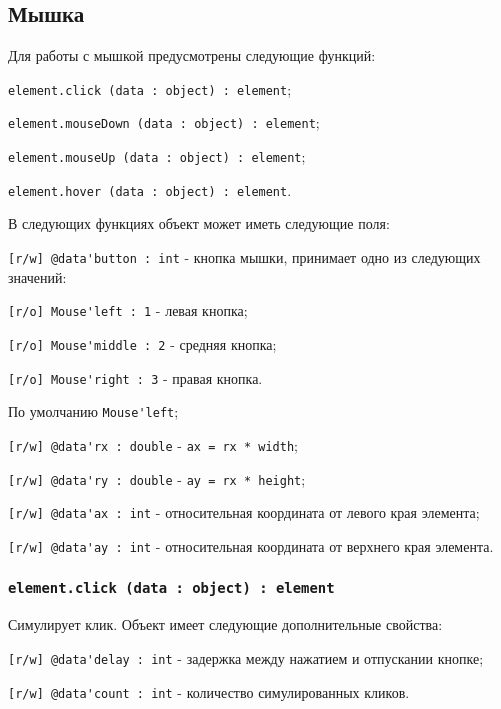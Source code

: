 \subsection{Мышка}
\label{mouse}

Для работы с мышкой предусмотрены следующие функций:
\begin{icItems}
	\item \lstinline|element.click (data : object) : element|;
	\item \lstinline|element.mouseDown (data : object) : element|;
	\item \lstinline|element.mouseUp (data : object) : element|;
	\item \lstinline|element.hover (data : object) : element|.
\end{icItems}

В следующих функциях объект  может иметь следующие поля:
\begin{icItems}
	\item \lstinline|[r/w] @data'button : int| - кнопка мышки, принимает одно из следующих значений:
	\begin{icItems}
		\item \lstinline|[r/o] Mouse'left : 1| - левая кнопка;
		\item \lstinline|[r/o] Mouse'middle : 2| - средняя кнопка;
		\item \lstinline|[r/o] Mouse'right : 3| - правая кнопка.
	\end{icItems}
	По умолчанию \lstinline|Mouse'left|;
	\item \lstinline|[r/w] @data'rx : double| - \lstinline|ax = rx * width|;
	\item \lstinline|[r/w] @data'ry : double| - \lstinline|ay = rx * height|;
	\item \lstinline|[r/w] @data'ax : int| - относительная координата от левого края элемента;
	\item \lstinline|[r/w] @data'ay : int| - относительная координата от верхнего края элемента.
\end{icItems}

\subsubsection{\lstinline|element.click (data : object) : element|}

Симулирует клик. Объект  имеет следующие дополнительные свойства:
\begin{icItems}
	\item \lstinline|[r/w] @data'delay : int| - задержка между нажатием и отпускании кнопке;
	\item \lstinline|[r/w] @data'count : int| - количество симулированных кликов.
\end{icItems}

